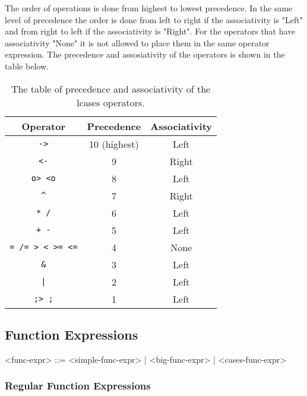 \documentclass{article}
\begin{document}
The order of operations is done from highest to lowest precedence. In the same
level of precedence the order is done from left to right if the associativity
is "Left" and from right to left if the associativity is "Right". For the
operators that have associativity "None" it is not allowed to place them in the
same operator expression. The precedence and assosiativity of the operators
is shown in the table below.
\begin{table}[h!]

\caption{ The table of precedence and associativity of the lcases operators.  }

\begin{center}
\begin{tabular}{ |c|c|c| } 
\hline
Operator & Precedence & Associativity \\ 
\hline
\hline
\texttt{->} & 10 (highest) & Left \\
\hline
\texttt{<-} & 9 & Right \\
\hline
\texttt{o> <o} & 8 & Left \\
\hline
\texttt{\^} & 7 & Right \\
\hline
\texttt{* /} & 6 & Left \\
\hline
\texttt{+ -} & 5 & Left \\ 
\hline
\texttt{= /= > < >= <=} & 4 & None \\
\hline
\texttt{\&} & 3 & Left \\
\hline
\texttt{|} & 2 & Left \\
\hline
\texttt{;> ;} & 1 & Left \\
\hline
\end{tabular}
\end{center}

\label{table:precassoc}

\end{table}

\newpage
\subsection{Function Expressions}
\label{subsec:funcexprs}

\begin{grammar}
<func-expr> ::= <simple-func-expr> | <big-func-expr> | <cases-func-expr>
\end{grammar}

\subsubsection{Regular Function Expressions}
\end{document}
